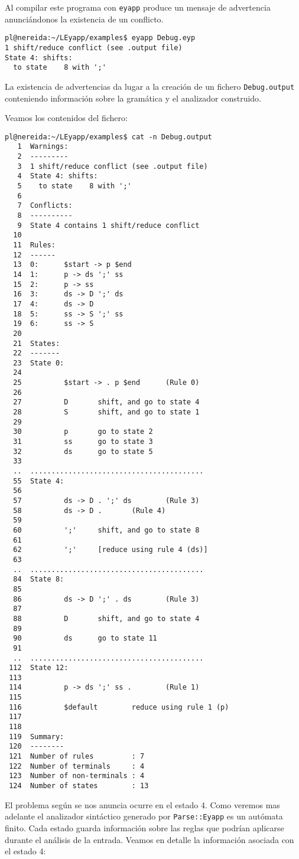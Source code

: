 Al compilar este programa con \verb|eyapp| produce un mensaje de advertencia anunciándonos
la existencia de un conflicto.
\begin{verbatim}
pl@nereida:~/LEyapp/examples$ eyapp Debug.eyp
1 shift/reduce conflict (see .output file)
State 4: shifts:
  to state    8 with ';'
\end{verbatim}
La existencia de advertencias da lugar a la creación de
un fichero \verb|Debug.output| conteniendo información
sobre la gramática y el analizador construido.

Veamos los contenidos del fichero:

\begin{verbatim}
pl@nereida:~/LEyapp/examples$ cat -n Debug.output
   1  Warnings:
   2  ---------
   3  1 shift/reduce conflict (see .output file)
   4  State 4: shifts:
   5    to state    8 with ';'
   6
   7  Conflicts:
   8  ----------
   9  State 4 contains 1 shift/reduce conflict
  10
  11  Rules:
  12  ------
  13  0:      $start -> p $end
  14  1:      p -> ds ';' ss
  15  2:      p -> ss
  16  3:      ds -> D ';' ds
  17  4:      ds -> D
  18  5:      ss -> S ';' ss
  19  6:      ss -> S
  20
  21  States:
  22  -------
  23  State 0:
  24
  25          $start -> . p $end      (Rule 0)
  26
  27          D       shift, and go to state 4
  28          S       shift, and go to state 1
  29
  30          p       go to state 2
  31          ss      go to state 3
  32          ds      go to state 5
  33
  ..  .........................................
  55  State 4:
  56
  57          ds -> D . ';' ds        (Rule 3)
  58          ds -> D .       (Rule 4)
  59
  60          ';'     shift, and go to state 8
  61
  62          ';'     [reduce using rule 4 (ds)]
  63
  ..  .........................................
  84  State 8:
  85
  86          ds -> D ';' . ds        (Rule 3)
  87
  88          D       shift, and go to state 4
  89
  90          ds      go to state 11
  91
  ..  .........................................
 112  State 12:
 113
 114          p -> ds ';' ss .        (Rule 1)
 115
 116          $default        reduce using rule 1 (p)
 117
 118
 119  Summary:
 120  --------
 121  Number of rules         : 7
 122  Number of terminals     : 4
 123  Number of non-terminals : 4
 124  Number of states        : 13
\end{verbatim}

El problema según se nos anuncia ocurre en el estado 4.
Como veremos mas adelante el analizador sintáctico
generado por \verb|Parse::Eyapp| es un autómata finito.
Cada estado guarda información sobre las reglas 
que podrían aplicarse durante el análisis de la entrada.
Veamos en detalle la información asociada con el estado 4:

